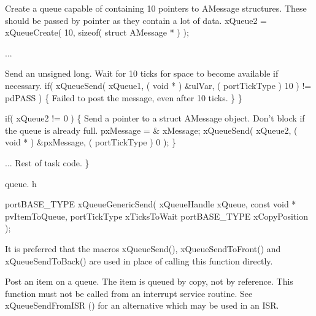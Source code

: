 \begin{DoxyPre}Create a queue capable of containing 10 pointers to AMessage structures.
These should be passed by pointer as they contain a lot of data.
        xQueue2 = xQueueCreate( 10, sizeof( struct AMessage * ) );\end{DoxyPre}



\begin{DoxyPre}...
\begin{DoxyVerb}    if( xQueue1 != 0 )
    {
\end{DoxyVerb}

Send an unsigned long.  Wait for 10 ticks for space to become
available if necessary.
                if( xQueueSend( xQueue1, ( void * ) \&ulVar, ( portTickType ) 10 ) != pdPASS )
                \{
Failed to post the message, even after 10 ticks.
                \}
        \}\end{DoxyPre}



\begin{DoxyPre}        if( xQueue2 != 0 )
        \{
Send a pointer to a struct AMessage object.  Don't block if the
queue is already full.
                pxMessage = \& xMessage;
                xQueueSend( xQueue2, ( void * ) \&pxMessage, ( portTickType ) 0 );
        \}\end{DoxyPre}



\begin{DoxyPre}... Rest of task code.
 \}
 \end{DoxyPre}


queue. h 
\begin{DoxyPre}
 portBASE\_TYPE xQueueGenericSend(
                                                                        xQueueHandle xQueue,
                                                                        const void * pvItemToQueue,
                                                                        portTickType xTicksToWait
                                                                        portBASE\_TYPE xCopyPosition
                                                                );
   \end{DoxyPre}


It is preferred that the macros x\-Queue\-Send(), x\-Queue\-Send\-To\-Front() and x\-Queue\-Send\-To\-Back() are used in place of calling this function directly.

Post an item on a queue. The item is queued by copy, not by reference. This function must not be called from an interrupt service routine. See x\-Queue\-Send\-From\-I\-S\-R () for an alternative which may be used in an I\-S\-R.


